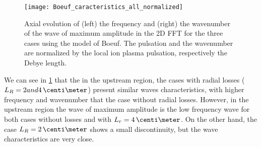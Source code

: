\begin{figure}[hbtp]
  \centering
  \texttt{[image: Boeuf\_caracteristics\_all\_normalized]}
  \caption{Axial evolution of (left) the frequency and (right) the wavenumber of the wave of maximum amplitude in the \ac{2D} \ac{FFT} for the three cases using the model of Boeuf. The pulsation and the wavenumber are normalized by the local ion plasma pulsation, respectively the Debye length.}
  \label{fig-axial_maxwave_normalized}
\end{figure}

We can see in \cref{fig-axial_maxwave_normalized} that the in the upstream region, the cases with radial losses ($L_R=2 and 4\,\centi\meter$) present similar waves characteristics, with higher frequency and wavenumber that the case without radial losses.
However, in the upstream region the wave of maximum amplitude is the low frequency wave for both cases without losses and with $L_r=4\,\centi\meter$.
On the other hand, the case $L_R=2\,\centi\meter$ shows a small discontinuity, but the wave characteristics are very close.



